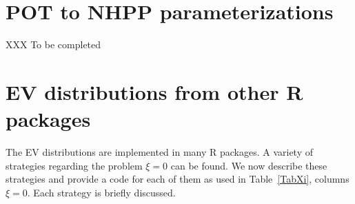 \documentclass[11pt]{article}\usepackage[]{graphicx}\usepackage[]{xcolor}
\begin{document}
\section{POT to NHPP parameterizations}

XXX To be completed





\section{EV distributions from other R packages}

The EV distributions are implemented in many R packages. A variety of
strategies regarding the problem $\xi = 0$ can be found. We now
describe these strategies and provide a code for each of them as used
in Table~\ref{TabXi}, columns $\xi = 0$. Each strategy is briefly
discussed.
\end{document}
